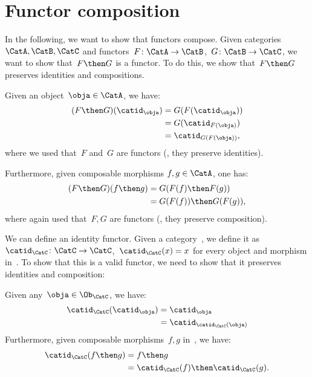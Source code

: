 

\section{Functor composition}


In the following, we want to show that functors compose.
Given categories~$\CatA,\CatB,\CatC$ and functors~$F\colon \CatA\to \CatB$,~$G\colon \CatB\to \CatC$, we want to show that~$F\then G$ is a functor. To do this, we show that~$F\then G$ preserves identities and compositions.
\begin{compactitem}
  \item Given an object~$\obja\in \CatA$, we have:
  \begin{equation*}
    \begin{aligned}
    (F\then G)(\catid_\obja)
      &=G(F(\catid_\obja))\\
      &=G(\catid_{F(\obja)})\\
      &=\catid_{G(F(\obja))},
    \end{aligned}
  \end{equation*}
  where we used that~$F$ and~$G$ are functors (\ie , they preserve identities).
  \item Furthermore, given composable morphisms $f,g\in \CatA$, one has:
  \begin{equation*}
    \begin{aligned}
    (F\then G)(f\then g)
      &=G(F(f)\then F(g))\\
      &=G(F(f))\then G(F(g)),
    \end{aligned}
  \end{equation*}
  where again used that~$F,G$ are functors (\ie , they preserve composition).
\end{compactitem}


We can define an identity functor. Given a category~\CatC, we define it as~$\catid_\CatC\colon \CatC \to \CatC$,~$\catid_\CatC(x)=x$ for every object and morphism in~\CatC. To show that this is a valid functor, we need to show that it preserves identities and composition:
\begin{compactitem}
  \item Given any~$\obja \in \Ob_\CatC$, we have:
  \begin{equation*}
    \begin{aligned}
      \catid_\CatC(\catid_\obja)&=\catid_\obja\\
      &=\catid_{\catid_\CatC(\obja)}
    \end{aligned}
  \end{equation*}
  Furthermore, given composable morphisms~$f,g$ in~\CatC, we have:
  \begin{equation*}
    \begin{aligned}
      \catid_{\CatC}(f\then g)&=f\then g\\
      &=\catid_{\CatC}(f)\then \catid_{\CatC} (g).
    \end{aligned}
  \end{equation*}
\end{compactitem}


